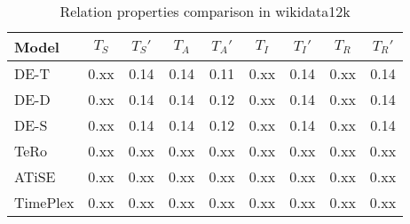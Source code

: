 \begin{table*}[htb]
\centering
\begin{minipage}{0.95\textwidth}
\centering
\caption{Relation properties comparison in wikidata12k}
\vspace{-3mm}

\begin{tabular}{l|cc|cc|cc|cc}\hline
Model       & $T_S$ & $T_S'$ & $T_A$ & $T_A'$ & $T_I$ & $T_I'$ & $T_R$ & $T_R'$ \\ \hline
DE-T & 0.xx & 0.14 & 0.14 & 0.11 & 0.xx & 0.14 & 0.xx & 0.14 \\ 
DE-D & 0.xx & 0.14 & 0.14 & 0.12 & 0.xx & 0.14 & 0.xx & 0.14 \\ 
DE-S & 0.xx & 0.14 & 0.14 & 0.12 & 0.xx & 0.14 & 0.xx & 0.14 \\ 
TeRo & 0.xx & 0.xx & 0.xx & 0.xx & 0.xx & 0.xx & 0.xx & 0.xx \\ 
ATiSE & 0.xx & 0.xx & 0.xx & 0.xx & 0.xx & 0.xx & 0.xx & 0.xx \\ 
TimePlex & 0.xx & 0.xx & 0.xx & 0.xx & 0.xx & 0.xx & 0.xx & 0.xx \\ 
 \hline
\end{tabular}

\label{fig:relation_properties_wikidata12k_comparison}
\end{minipage}
\end{table*}

